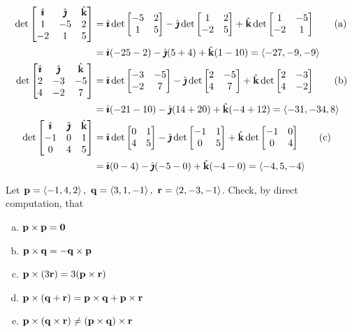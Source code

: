 \begin{solution}
\leqnomode
\begin{align}
\det\left[\begin{matrix}\hi&\hj&\hk\cr1&-5&2\cr-2&1&5\end{matrix}\right] 
&=\hi\det\left[\begin{matrix}-5&2\cr1&5\end{matrix}\right]
-\hj\det\left[\begin{matrix}1&2\cr-2&5\end{matrix}\right]
+\hk\det\left[\begin{matrix}1&-5\cr-2&1\end{matrix}\right]\tag{a}\\
&=\hi(-25-2)-\hj(5+4)+\hk(1-10) 
= \llt -27,-9,-9\rgt \notag\\
%
\det\left[\begin{matrix}\hi&\hj&\hk\cr2&-3&-5\cr4&-2&7\end{matrix}\right] 
&=\hi\det\left[\begin{matrix}-3&-5\cr-2&7\end{matrix}\right]
-\hj\det\left[\begin{matrix}2&-5\cr4&7\end{matrix}\right]
+\hk\det\left[\begin{matrix}2&-3\cr4&-2\end{matrix}\right]\tag{b} \\
&=\hi(-21-10)-\hj(14+20)+\hk(-4+12) 
= \llt -31,-34,8\rgt \notag\\
%
\det\left[\begin{matrix}\hi&\hj&\hk\cr-1&0&1\cr0&4&5\end{matrix}\right] 
&=\hi\det\left[\begin{matrix}0&1\cr4&5\end{matrix}\right]
-\hj\det\left[\begin{matrix}-1&1\cr0&5\end{matrix}\right]
+\hk\det\left[\begin{matrix}-1&0\cr0&4\end{matrix}\right] \tag{c} \\
&=\hi(0-4)-\hj(-5-0)+\hk(-4-0) 
= \llt -4,5,-4\rgt \notag
\end{align}
\reqnomode
\end{solution}

\begin{question}
Let $\mathbf{p}=\left< -1,4,2\right> ,\ \mathbf{q}=\left< 3,1,-1\right> ,\ \mathbf{r}=\left< 2,-3,-1\right> $.
Check, by direct computation, that
\begin{enumerate}[(a)]
\item $\mathbf{p}\times\mathbf{p}=\mathbf{0}$
\item $\mathbf{p}\times\mathbf{q}=-\mathbf{q}\times\mathbf{p}$
\item $\mathbf{p}\times(3\mathbf{r})=3(\mathbf{p}\times\mathbf{r})$
\item $\mathbf{p}\times(\mathbf{q}+\mathbf{r}) = \mathbf{p}\times\mathbf{q}+\mathbf{p}\times\mathbf{r}$
\item $\mathbf{p}\times(\mathbf{q}\times\mathbf{r}) \ne (\mathbf{p}\times\mathbf{q})\times\mathbf{r}$
\end{enumerate}
\end{question}

